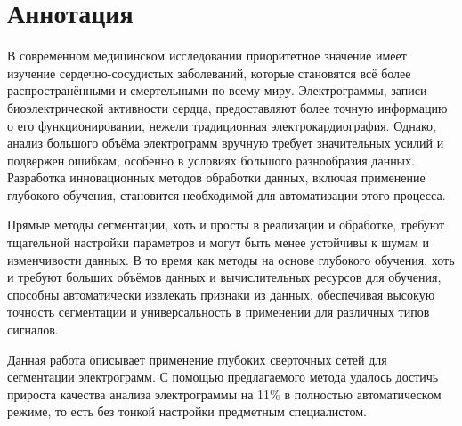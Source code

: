 \section*{Аннотация}

В современном медицинском исследовании приоритетное значение имеет изучение
сердечно-сосудистых заболеваний, которые становятся всё более распространёнными
и смертельными по всему миру. Электрограммы, записи биоэлектрической активности
сердца, предоставляют более точную информацию о его функционировании, нежели
традиционная электрокардиография. Однако, анализ большого объёма электрограмм
вручную требует значительных усилий и подвержен ошибкам, особенно в условиях
большого разнообразия данных. Разработка инновационных методов обработки данных,
включая применение глубокого обучения, становится необходимой для автоматизации
этого процесса.

Прямые методы сегментации, хоть и просты в реализации и обработке, требуют
тщательной настройки параметров и могут быть менее устойчивы к шумам и
изменчивости данных. В то время как методы на основе глубокого обучения, хоть и
требуют больших объёмов данных и вычислительных ресурсов для обучения, способны
автоматически извлекать признаки из данных, обеспечивая высокую точность
сегментации и универсальность в применении для различных типов сигналов.

Данная работа описывает применение глубоких сверточных сетей для сегментации
электрограмм. С помощью предлагаемого метода удалось достичь прироста качества
анализа электрограммы на 11\% в полностью автоматическом режиме, то есть без
тонкой настройки предметным специалистом.
